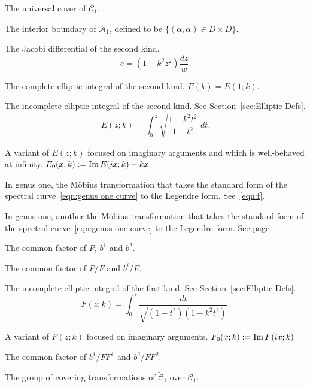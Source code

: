 \begin{description}[align=right]
\item[$\mathcal{\tilde{C}}_1$] The universal cover of $\mathcal{C}_1$.

\item[$\mathcal{D}$] The interior boundary of $\mathcal{A}_1$, defined to be $\{ (α,α) \in D \times D\}$.

\item[$e$] The Jacobi differential of the second kind.
\[
e = (1-k^2z^2) \frac{dz}{w}.
\]

\item[$E(k)$] The complete elliptic integral of the second kind. $E(k) = E(1;k)$.

\item[$E(z;k)$] The incomplete elliptic integral of the second kind. See Section~\ref{sec:Elliptic Defs}.
\[
E(z;k) = \int_0^z \sqrt{\frac{1-k^2 t^2}{1-t^2}} \;dt.
\]

\item[$E_0(x;k)$] A variant of $E(z;k)$ focused on imaginary arguments and which is well-behaved at infinity. $E_0 (x ; k) := \operatorname{Im} E(i x; k) - kx$

\item[$f(ζ)$] In genus one, the M\"obius transformation that takes the standard form of the spectral curve~\eqref{eqn:genus one curve} to the Legendre form. See~\eqref{eqn:f}.

\item[$f_s(ζ)$] In genus one, another the M\"obius transformation that takes the standard form of the spectral curve~\eqref{eqn:genus one curve} to the Legendre form. See page~\pageref{para:def f_s}.

\item[$F$] The common factor of $P$, $b^1$ and $b^2$.
\item[$F^i$] The common factor of $P/F$ and $b^i/F$.

\item[$F(z;k)$] The incomplete elliptic integral of the first kind. See Section~\ref{sec:Elliptic Defs}.
\[
F(z;k) = \int_0^z \frac{dt}{\sqrt{(1-t^2)(1-k^2 t^2)}}.
\]

\item[$F_0(x;k)$] A variant of $F(z;k)$ focused on imaginary arguments. $F_0 (x ; k) := \operatorname{Im} F(i x; k)$

\item[$G$] The common factor of $b^1/FF^1$ and $b^2/FF^2$.

\item[$\mathcal{G}$] The group of covering transformations of $\mathcal{\tilde{C}}_1$ over $\mathcal{C}_1$.


\end{description}
